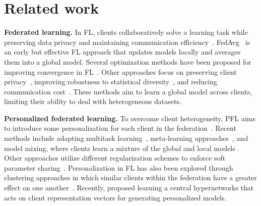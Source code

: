 \documentclass{article}
\begin{document}
\section{Related work} \label{sec:related_work}
\textbf{Federated learning.}
In FL, clients collaboratively solve a learning task while preserving data privacy and maintaining communication efficiency~\cite{9220780,kairouz2019advances,li2020federated,mcmahan2017communication,mothukuri2021survey,yang2019federated,ZHANG2021106775}. FedAvg~\cite{mcmahan2017communication} is an early but effective FL approach that updates models locally and averages them into a global model. 
Several optimization methods have been proposed for improving convergence in FL~\cite{li2018convergence,lin2018don,stich2018local,wang2018cooperative}. Other approaches focus on preserving client privacy~\cite{agarwal2018cpsgd,duchi2014privacy, mcmahan2017learning, zhu2019federated}, improving robustness to statistical diversity~\cite{haddadpour2019convergence,hanzely2020federated,Hsu2019MeasuringTE,karimireddy2019scaffold,zhao2018federated,zhou2017convergence}, and reducing communication cost~\cite{dai2019hyper,reisizadeh2020fedpaq}. 
These methods aim to learn a global model across clients, limiting their ability to deal with heterogeneous datasets.

\textbf{Personalized federated learning.}
To overcome client heterogeneity, PFL aims to introduce some personalization for each client in the federation~\cite{Kulkarni2020SurveyOP,tan2021towards}. 
Recent methods include adapting multitask learning~\cite{dinh2021fedu,smith2017federated}, meta-learning approaches~\cite{behl2019alpha,Fallah2020PersonalizedFL,fallah2020convergence, jiang2019improving,li2017meta, zhou2019efficient}, and model mixing, where clients learn a mixture of the global and local models \cite{arivazhagan2019federated,deng2020adaptive,hanzely2020federated,liang2020think}.
Other approaches utilize different regularization schemes to enforce soft parameter sharing~\cite{Huang2020PersonalizedCF, t2020personalized}. Personalization in FL has also been explored through clustering approaches in which similar clients within the federation have a greater effect on one another~\cite{Mansour2020ThreeAF,zhang2020personalized}. 
Recently, \cite{shamsian2021personalized_icml} proposed learning a central hypernetworks that acts on client representation vectors for generating personalized models.
\end{document}
